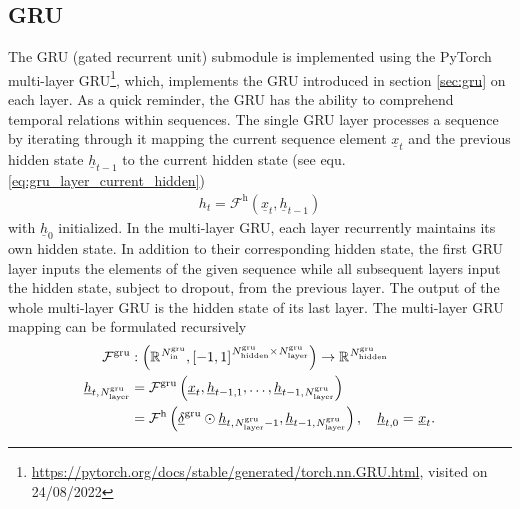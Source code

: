 \subsection*{GRU}
The GRU (gated recurrent unit) submodule
is implemented using the PyTorch
multi-layer GRU\footnote{
    \url{https://pytorch.org/docs/stable/generated/torch.nn.GRU.html}, visited on 24/08/2022
},
which, implements the GRU \cite{Cho2014} 
introduced in section \ref{sec:gru} on each layer.
As a quick reminder, 
the GRU has the ability to comprehend temporal relations within sequences.
The single GRU layer processes a sequence by
iterating through it
mapping the current sequence element $\underline x_t$ and the previous hidden state 
$\underline h_{t-1}$ 
to the current hidden state (see equ. \ref{eq:gru_layer_current_hidden})
\begin{align}
    h_{t}
    =
    \mathcal{F}^\text{h} \left( \underline x_{t}, \underline h_{t-1}\right)
\end{align}
with $\underline h_{0}$ initialized.
In the multi-layer GRU,
each layer recurrently maintains its own hidden state.
In addition to their corresponding hidden state,
the first GRU layer inputs the elements of the given sequence
while all subsequent layers input the hidden state,
subject to dropout,
from the previous layer.
The output of the whole multi-layer GRU
is the hidden state of its last layer.
The multi-layer GRU mapping can be 
formulated recursively
\begin{align} \label{eq:gru}
    \mathcal{F}^\text{\gru}
    &:
    \left(
        \mathbb{R}^{\num[]{\gru}{\text{in}}{}{}},
        \left[-1, 1\right]^{\num[]{\gru}{\text{hidden}}{}{} \times \num[]{\gru}{\text{layer}}{}{}}
    \right)
    \rightarrow 
    \mathbb{R}^{
        \num[]{\gru}{\text{hidden}}{}{}
    }
    \nonumber \\
    \underline h_{t, \num[]{\gru}{\text{layer}}{}{}} 
    &=
    \mathcal{F}^{\gru} \left( 
        \underline x_{t}, 
        \underline h_{t-1, 1}, 
        \dots, 
        \underline h_{t-1, \num[]{\gru}{\text{layer}}{}{}}
        \right)
    \nonumber \\
    &= 
    \mathcal{F}^\text{h} \left( 
        \underline\delta^\gru
        \odot
        \underline h_{t, \num[]{\gru}{\text{layer}}{}{}-1}
    , \underline h_{t-1,\num[]{\gru}{\text{layer}}{}{}}\right)
    ,\quad \underline h_{t, 0} = \featvec[]{}{t}{}{}
    .
\end{align}
